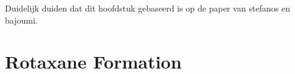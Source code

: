 Duidelijk duiden dat dit hoofdstuk gebaseerd is op de paper van stefanos en bajoumi.
\section{Rotaxane Formation}
